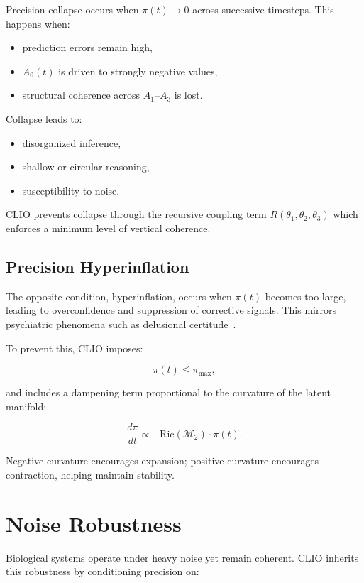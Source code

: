 \documentclass[12pt,oneside]{book}
\theoremstyle{plain}
\theoremstyle{definition}
\let\citep\parencite
\begin{document}
Precision collapse occurs when $\pi(t) \rightarrow 0$ across successive timesteps.
This happens when:

\begin{itemize}
    \item prediction errors remain high,
    \item $A_0(t)$ is driven to strongly negative values,
    \item structural coherence across $A_1$--$A_3$ is lost.
\end{itemize}

Collapse leads to:

\begin{itemize}
    \item disorganized inference,
    \item shallow or circular reasoning,
    \item susceptibility to noise.
\end{itemize}

CLIO prevents collapse through the recursive coupling term $R(\theta_1,\theta_2,\theta_3)$
which enforces a minimum level of vertical coherence.

\subsection{Precision Hyperinflation}

The opposite condition, hyperinflation, occurs when $\pi(t)$ becomes too large,
leading to overconfidence and suppression of corrective signals.
This mirrors psychiatric phenomena such as delusional certitude~\citep{friston2014computational}.

To prevent this, CLIO imposes:

\[
\pi(t) \leq \pi_{\max},
\]

and includes a dampening term proportional to the curvature of the latent
manifold:

\[
\frac{d\pi}{dt} \propto -\mathrm{Ric}(\mathcal{M}_2) \cdot \pi(t).
\]

Negative curvature encourages expansion; positive curvature encourages
contraction, helping maintain stability.

\section{Noise Robustness}

Biological systems operate under heavy noise yet remain coherent.
CLIO inherits this robustness by conditioning precision on:
\end{document}
